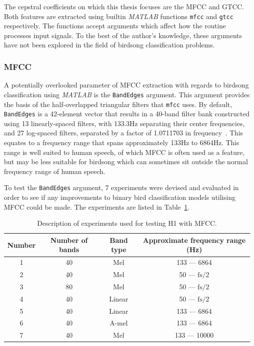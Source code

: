 The cepstral coefficients on which this thesis focuses are the MFCC and GTCC\@.
Both features are extracted using builtin \textit{MATLAB} functions
\texttt{mfcc} and \texttt{gtcc} respectively. The functions accept arguments
which affect how the routine processes input signals. To the best of the
author's knowledge, these arguments have not been explored in the field of
birdsong classification problems.

\subsubsection{MFCC}\label{sssec:mfcc}

A potentially overlooked parameter of MFCC extraction with regards to birdsong
classification using \textit{MATLAB} is the \texttt{BandEdges} argument. This
argument provides the basis of the half-overlapped triangular filters that
\texttt{mfcc} uses. By default, \texttt{BandEdges} is a 42-element vector that
results in a 40-band filter bank constructed using 13 linearly-spaced filters,
with 133.3Hz separating their center frequencies, and 27 log-spaced filters,
separated by a factor of 1.0711703 in frequency~\cite{slaney1998auditory}. This
equates to a frequency range that spans approximately 133Hz to 6864Hz. This
range is well suited to human speech, of which MFCC is often used as a feature,
but may be less suitable for birdsong which can sometimes sit outside the normal
frequency range of human speech.

To test the \texttt{BandEdges} argument, 7 experiments were devised and
evaluated in order to see if any improvements to binary bird classification
models utilising MFCC could be made. The experiments are listed in
Table~\ref{table:h1_mfcc_experiments}.

\begin{table}[h!t]
\begin{center}
\begin{tabular}{c c c c}
\toprule
Number & Number of bands & Band type & Approximate frequency range (Hz) \\ [0.5ex]
\midrule
1 & 40 & Mel & 133 --- 6864 \\
2 & 40 & Mel & 50 --- $\text{fs}/2$ \\
3 & 80 & Mel & 50 --- $\text{fs}/2$ \\
4 & 40 & Linear & 50 --- $\text{fs}/2$ \\
5 & 40 & Linear & 133 --- 6864 \\
6 & 40 & A-mel & 133 --- 6864 \\
7 & 40 & Mel & 133 --- 10000 \\
\bottomrule
\end{tabular}
\caption{Description of experiments used for testing H1 with
MFCC.}\label{table:h1_mfcc_experiments}
\end{center}
\end{table}


